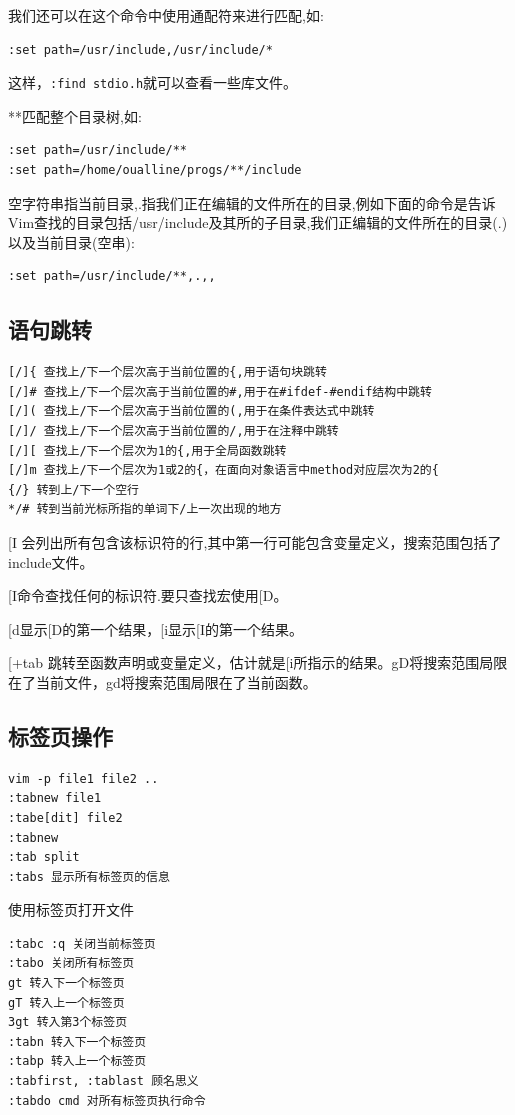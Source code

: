 {我们还可以在这个命令中使用通配符来进行匹配,如:
\begin{verbatim}
:set path=/usr/include,/usr/include/*
\end{verbatim}
这样，\verb+:find stdio.h+就可以查看一些库文件。

**匹配整个目录树,如:
\begin{verbatim}
:set path=/usr/include/**
:set path=/home/oualline/progs/**/include
\end{verbatim}
空字符串指当前目录,.指我们正在编辑的文件所在的目录,例如下面的命令是告诉Vim查找的目录包括/usr/include及其所的子目录,我们正编辑的文件所在的目录(.)以及当前目录(空串):
\begin{verbatim}
:set path=/usr/include/**,.,,
\end{verbatim}

\subsection{语句跳转}
\begin{verbatim}
[/]{ 查找上/下一个层次高于当前位置的{,用于语句块跳转
[/]# 查找上/下一个层次高于当前位置的#,用于在#ifdef-#endif结构中跳转
[/]( 查找上/下一个层次高于当前位置的(,用于在条件表达式中跳转
[/]/ 查找上/下一个层次高于当前位置的/,用于在注释中跳转
[/][ 查找上/下一个层次为1的{,用于全局函数跳转
[/]m 查找上/下一个层次为1或2的{，在面向对象语言中method对应层次为2的{
{/} 转到上/下一个空行
*/# 转到当前光标所指的单词下/上一次出现的地方
\end{verbatim}
[I 会列出所有包含该标识符的行,其中第一行可能包含变量定义，搜索范围包括了include文件。

[I命令查找任何的标识符.要只查找宏使用[D。

[d显示[D的第一个结果，[i显示[I的第一个结果。

[+tab 跳转至函数声明或变量定义，估计就是[i所指示的结果。gD将搜索范围局限在了当前文件，gd将搜索范围局限在了当前函数。

\subsection{标签页操作}

\begin{verbatim}
vim -p file1 file2 ..
:tabnew file1
:tabe[dit] file2
:tabnew
:tab split
:tabs 显示所有标签页的信息
\end{verbatim}
使用标签页打开文件

\begin{verbatim}
:tabc :q 关闭当前标签页
:tabo 关闭所有标签页
gt 转入下一个标签页
gT 转入上一个标签页
3gt 转入第3个标签页
:tabn 转入下一个标签页
:tabp 转入上一个标签页
:tabfirst, :tablast 顾名思义
:tabdo cmd 对所有标签页执行命令
\end{verbatim}





}
